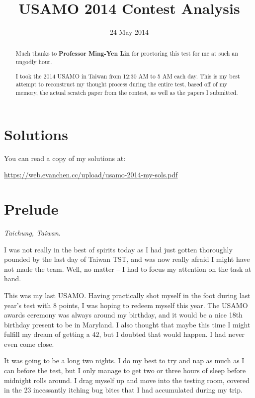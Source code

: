 \documentclass[11pt]{scrartcl}
\begin{document}
\title{USAMO 2014 Contest Analysis}
\date{24 May 2014}
\maketitle

\begin{abstract}
  Much thanks to \textbf{Professor Ming-Yen Lin}
  for proctoring this test for me at such an ungodly hour.

  I took the 2014 USAMO in Taiwan
  from 12:30 AM to 5 AM each day.
  This is my best attempt to reconstruct my thought process
  during the entire test, based off of my memory,
  the actual scratch paper from the contest,
  as well as the papers I submitted.
\end{abstract}

\tableofcontents
\section*{Solutions}
You can read a copy of my solutions at:
\begin{center}
  \url{https://web.evanchen.cc/upload/usamo-2014-my-sols.pdf}
\end{center}
\eject

\section{Prelude}
\emph{Taichung, Taiwan}.

I was not really in the best of spirits today as I had just gotten thoroughly pounded by the last day of Taiwan TST, and was now really afraid I might have not made the team.
Well, no matter -- I had to focus my attention on the task at hand.

This was my last USAMO. Having practically shot myself in the foot during last year's test with 8 points, I was hoping to redeem myself this year. The USAMO awards ceremony was always around my birthday, and it would be a nice 18th birthday present to be in Maryland. I also thought that maybe this time I might fulfill my dream of getting a $42$, but I doubted that would happen. I had never even come close.

It was going to be a long two nights.
I do my best to try and nap as much as I can before the test, but I only manage to get two or three hours of sleep before midnight rolls around. I drag myself up and move into the testing room, covered in the 23 incessantly itching bug bites that I had accumulated during my trip.
\end{document}
